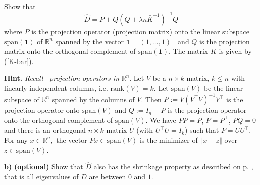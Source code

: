 \documentclass[11pt,twoside]{article}%
\theoremstyle{change}
\begin{document}
Show that
\begin{equation}
\hat{D}=P+Q\left(  Q+\lambda n\bar{K}^{-1}\right)  ^{-1}Q\label{hat-matrix}%
\end{equation}
where $P$ is the projection operator (projection matrix) onto the linear
subspace $\mathrm{span}(\boldsymbol{1})$ of $\mathbb{R}^{n}$ spanned by the
vector $\boldsymbol{1}=\left(  1,\ldots,1\right)  ^{\top}$ and $Q$ is the
projection matrix onto the orthogonal complement of $\mathrm{span}%
(\boldsymbol{1})$. The matrix $\bar{K}$ is given by (\ref{K-bar}).

\bigskip

\textbf{Hint. }\textit{Recall }\textbf{\ }\textit{projection operators in
}$\mathbb{R}^{n}$. Let $V$ be a $n\times k$ matrix, $k\leq n$ with linearly
independent columns, i.e. $\mathrm{rank}(V)=k.$ Let $\mathrm{span}(V)$ be the
linear subspace of $\mathbb{R}^{n}$ spanned by the columns of $V$. Then
$P:=V\left(  V^{\top}V\right)  ^{-1}V^{\top}$ is the projection operator onto
$\mathrm{span}(V)$ and $Q:=I_{n}-P$ is the projection operator onto the
orthogonal complement of $\mathrm{span}(V)$. We have $PP=P$, $P=P^{\top}$,
$PQ=0$ and there is an orthogonal $n\times k$ matrix $U$ (with $U^{\top
}U=I_{k}$) such that $P=UU^{\top}$. For any $x\in\mathbb{R}^{n},$ the vector
$Px\in\mathrm{span}(V)$ is the minimizer of $\left\Vert x-z\right\Vert $ over
$z\in\mathrm{span}(V)$.

\bigskip

\textbf{b)} \textbf{(optional)} Show that $\hat{D}$ also has the shrinkage
property as described on p. \pageref{inequ-pos-def}, that is all eigenvalues
of $\hat{D}$ are between $0$ and $1$.%
\end{document}
